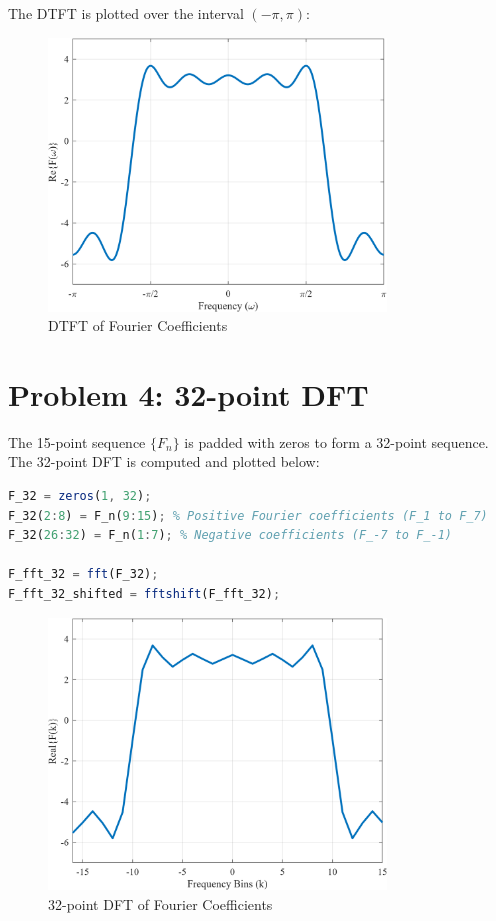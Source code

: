 \documentclass[12pt]{article}
\begin{document}
\vspace{1cm}
The DTFT is plotted over the interval $(-\pi, \pi)$:

\begin{figure}[H]
    \centering
    \includegraphics[width=0.8\textwidth]{DTFT.png}
    \caption{DTFT of Fourier Coefficients}
\end{figure}


\newpage
\section*{Problem 4: 32-point DFT}
The 15-point sequence $\{F_n\}$ is padded with zeros to form a 32-point sequence. The 32-point DFT is computed and plotted below:

\vspace{0.25cm}
\begin{lstlisting}[language=Octave, caption=MATLAB Script to Compute 32-point DFT]
F_32 = zeros(1, 32);
F_32(2:8) = F_n(9:15); % Positive Fourier coefficients (F_1 to F_7)
F_32(26:32) = F_n(1:7); % Negative coefficients (F_-7 to F_-1)

F_fft_32 = fft(F_32);
F_fft_32_shifted = fftshift(F_fft_32);
\end{lstlisting}

\vspace{1cm}
\begin{figure}[H]
    \centering
    \includegraphics[width=0.8\textwidth]{DFT_32.png}
    \caption{32-point DFT of Fourier Coefficients}
\end{figure}
\end{document}
